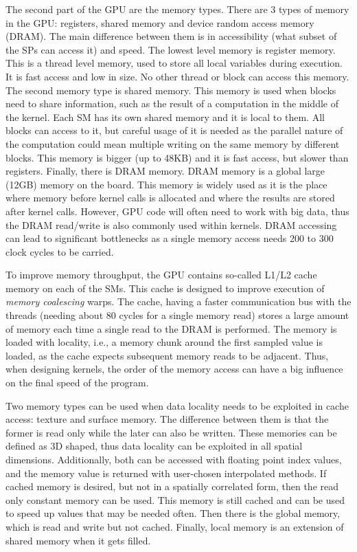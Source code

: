The second part of the GPU are the memory types. There are 3 types of memory in the GPU: registers, shared memory and device random access memory (DRAM). The main difference between them is in accessibility (what subset of the SPs can access it) and speed. The lowest level memory is register memory. This is a thread level memory, used to store all local variables during execution. It is fast access and low in size. No other thread or block can access this memory. The second memory type is shared memory. This memory is used when blocks need to share information, such as the result of a computation in the middle of the kernel. Each SM has its own shared memory and it is local to them. All blocks can access to it, but careful usage of it is needed as the parallel nature of the computation could mean multiple writing on the same memory by different blocks. This memory is bigger (up to 48KB) and it is fast access, but slower than registers. Finally, there is DRAM memory. DRAM memory is a global large (12GB) memory on the board. This memory is widely used as it is the place where memory before kernel calls is allocated and where the results are stored after kernel calls. However, GPU code will often need to work with big data, thus the DRAM read/write is also commonly used within kernels. DRAM accessing can lead to significant bottlenecks as a single memory access needs 200 to 300 clock cycles to be carried. 

To improve memory throughput, the GPU contains so-called L1/L2 cache memory on each of the SMs. This cache is designed to improve execution of \textit{memory coalescing} warps. The cache, having a faster communication bus with the threads (needing about 80 cycles for a single memory read) stores a large amount of memory each time a single read to the DRAM is performed. The memory is loaded with locality, i.e., a memory chunk around the first sampled value is loaded, as the cache expects subsequent memory reads to be adjacent. Thus, when designing kernels, the order of the memory access can have a big influence on the final speed of the program. 

Two memory types can be used when data locality needs to be exploited in cache access: texture and surface memory. The difference between them is that the former is read only while the later can also be written. These memories can be defined as 3D shaped, thus data locality can be exploited in all spatial dimensions. Additionally, both can be accessed with floating point index values, and the memory value is returned with user-chosen interpolated methods. If cached memory is desired, but not in a spatially correlated form, then the read only constant memory can be used. This memory is still cached and can be used to speed up values that may be needed often. Then there is the global memory, which is read and write but not cached. Finally, local memory is an extension of shared memory when it gets filled.

